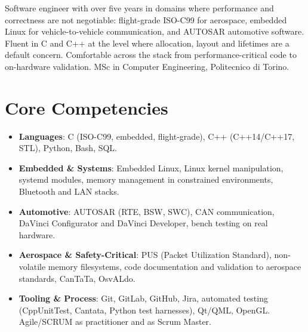 \documentclass[11pt,a4paper,sans]{moderncv}
\begin{document}
\makecvtitle


\vspace{6pt}
\small{Software engineer with over five years in domains where performance and correctness are not negotiable: flight-grade ISO-C99 for aerospace, embedded Linux for vehicle-to-vehicle communication, and AUTOSAR automotive software. Fluent in C and C++ at the level where allocation, layout and lifetimes are a default concern. Comfortable across the stack from performance-critical code to on-hardware validation. MSc in Computer Engineering, Politecnico di Torino.}


\section{Core Competencies}
\vspace{1pt}
\begin{itemize}

\item \textbf{Languages}: C (ISO-C99, embedded, flight-grade), C++ (C++14/C++17, STL), Python, Bash, SQL.

\item \textbf{Embedded \& Systems}: Embedded Linux, Linux kernel manipulation, systemd modules, memory management in constrained environments, Bluetooth and LAN stacks.

\item \textbf{Automotive}: AUTOSAR (RTE, BSW, SWC), CAN communication, DaVinci Configurator and DaVinci Developer, bench testing on real hardware.

\item \textbf{Aerospace \& Safety-Critical}: PUS (Packet Utilization Standard), non-volatile memory filesystems, code documentation and validation to aerospace standards, CanTaTa, OsvALdo.

\item \textbf{Tooling \& Process}: Git, GitLab, GitHub, Jira, automated testing (CppUnitTest, Cantata, Python test harnesses), Qt/QML, OpenGL. Agile/SCRUM as practitioner and as Scrum Master.

\end{itemize}
\end{document}
